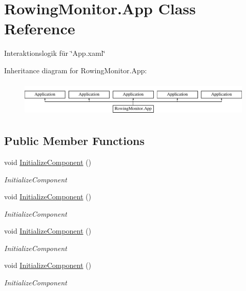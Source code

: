 \hypertarget{class_rowing_monitor_1_1_app}{}\section{Rowing\+Monitor.\+App Class Reference}
\label{class_rowing_monitor_1_1_app}


Interaktionslogik für \char`\"{}\+App.\+xaml\char`\"{}  


Inheritance diagram for Rowing\+Monitor.\+App\+:\begin{figure}[H]
\begin{center}
\leavevmode
\includegraphics[height=1.709924cm]{class_rowing_monitor_1_1_app}
\end{center}
\end{figure}
\subsection*{Public Member Functions}
\begin{DoxyCompactItemize}
\item 
void \hyperlink{class_rowing_monitor_1_1_app_a92cbce86d55626b5b411b795ec66c0c2}{Initialize\+Component} ()
\begin{DoxyCompactList}\small\item\em Initialize\+Component \end{DoxyCompactList}\item 
void \hyperlink{class_rowing_monitor_1_1_app_a92cbce86d55626b5b411b795ec66c0c2}{Initialize\+Component} ()
\begin{DoxyCompactList}\small\item\em Initialize\+Component \end{DoxyCompactList}\item 
void \hyperlink{class_rowing_monitor_1_1_app_a92cbce86d55626b5b411b795ec66c0c2}{Initialize\+Component} ()
\begin{DoxyCompactList}\small\item\em Initialize\+Component \end{DoxyCompactList}\item 
void \hyperlink{class_rowing_monitor_1_1_app_a92cbce86d55626b5b411b795ec66c0c2}{Initialize\+Component} ()
\begin{DoxyCompactList}\small\item\em Initialize\+Component \end{DoxyCompactList}\end{DoxyCompactItemize}
